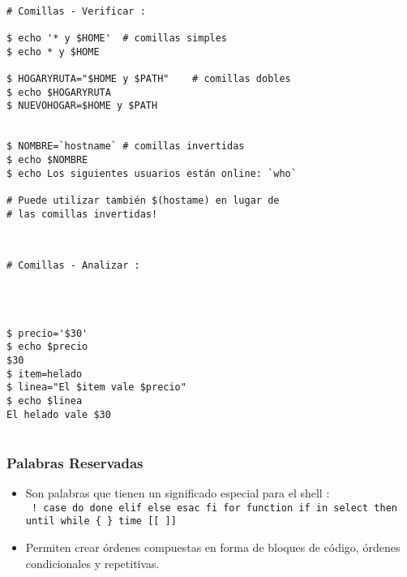 \documentclass{beamer}
\begin{document}
\begin{Verbatim}

# Comillas - Verificar : 

$ echo '* y $HOME'	# comillas simples
$ echo * y $HOME

$ HOGARYRUTA="$HOME y $PATH"	# comillas dobles
$ echo $HOGARYRUTA
$ NUEVOHOGAR=$HOME y $PATH


$ NOMBRE=`hostname`	# comillas invertidas
$ echo $NOMBRE
$ echo Los siguientes usuarios están online: `who` 

# Puede utilizar también $(hostame) en lugar de
# las comillas invertidas!


\end{Verbatim}


\begin{Verbatim}

# Comillas - Analizar :




$ precio='$30'
$ echo $precio 
$30 
$ item=helado 
$ linea="El $item vale $precio" 
$ echo $linea
El helado vale $30


\end{Verbatim}




\begin{frame}
\frametitle{Palabras Reservadas}
 \begin{itemize}
       \item Son palabras que  tienen  un  significado  especial
       para  el  shell :\\

\texttt{       ! case  do done elif else esac fi for function if in select then  until while \{ \} time [[ ]]}\\

\item Permiten crear órdenes compuestas en forma de bloques de código, órdenes condicionales y repetitivas.
\end{itemize}
\end{frame}
\end{document}
